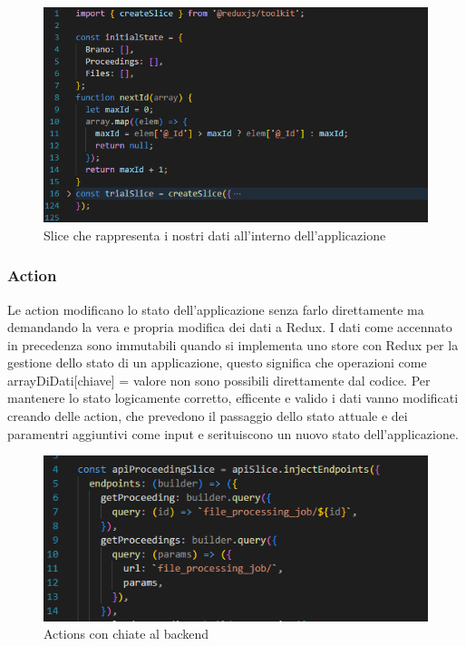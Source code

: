 \begin{figure}[H]
  \centering
  \includegraphics[width=\textwidth]{immagini/slice-reducer.png}
  \caption{Slice che rappresenta i nostri dati all'interno dell'applicazione}
\end{figure}

\subsubsection{Action}
Le action modificano lo stato dell'applicazione senza farlo direttamente ma demandando la vera e propria modifica dei dati a Redux. I dati come accennato in precedenza sono immutabili
quando si implementa uno store con Redux per la gestione dello stato di un applicazione, questo significa che operazioni come arrayDiDati[chiave] = valore non sono possibili
direttamente dal codice. Per mantenere lo stato logicamente corretto, efficente e valido i dati vanno modificati creando delle action, che prevedono il passaggio dello stato attuale
e dei paramentri aggiuntivi come input e serituiscono un nuovo stato dell'applicazione.

\begin{figure}[H]
  \centering
  \includegraphics[width=\textwidth]{immagini/api-action.png}
  \caption{Actions con chiate al backend}
\end{figure}

